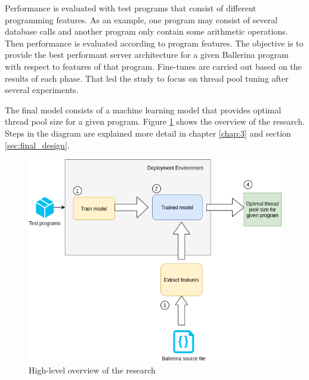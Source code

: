 	Performance is evaluated with test programs that consist of different programming features. As an example, one program may consist of several database calls and another program only contain some arithmetic operations. Then performance is evaluated according to program features. The objective is to provide the best performant server architecture for a given Ballerina program with respect to features of that program. Fine-tunes are carried out based on the results of each phase. That led the study to focus on thread pool tuning after several experiments. 
	
	The final model consists of a machine learning model that provides optimal thread pool size for a given program. Figure  \ref{hl_architecture} shows the overview of the research. Steps in the diagram are explained more detail in chapter \ref{chap:3} and section \ref{sec:final_design}.
	

	
	\begin{figure}[htbp]
		\begin{center}
			\includegraphics[scale=0.5]{figures/hl_architecture.png}
		\end{center}
		\caption{High-level overview of the research}
		\label{hl_architecture}
	\end{figure}
	

